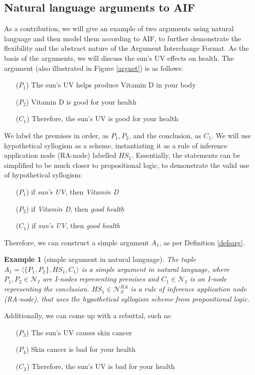\documentclass[12pt, a4paper]{article}
\newtheorem{Ex}{Example}[subsection]
\begin{document}
\subsection{Natural language arguments to AIF}
As a contribution, we will give an example of two arguments using natural language and then model them according to AIF, to further demonstrate the flexibility and the abstract nature of the Argument Interchange Format. As the basis of the arguments, we will discuss the sun's UV effects on health. The argument (also illustrated in Figure \ref{argnet}) is as follows:
\begin{itemize}
    \item[($P_1$)] The sun's UV helps produce Vitamin D in your body
    \item[($P_2$)] Vitamin D is good for your health
    \item[($C_1$)] Therefore, the sun's UV is good for your health
\end{itemize}
We label the premises in order, as $P_1, P_2$, and the conclusion, as $C_1$. We will use hypothetical syllogism as a scheme, instantiating it as a rule of inference application node (RA-node) labelled $HS_1$. Essentially, the statements can be simplified to be much closer to propositional logic, to demonstrate the valid use of hypothetical syllogism:
\begin{itemize}
    \item[($P_1$)] if \emph{sun's UV}, then \emph{Vitamin D}
    \item[($P_2$)] if \emph{Vitamin D}, then \emph{good health}
    \item[($C_1$)] if \emph{sun's UV}, then \emph{good health}
\end{itemize}
Therefore, we can construct a simple argument $A_1$, as per Definition \ref{defsarg}.
\begin{Ex}[simple argument in natural language]
\sloppy The tuple $A_1 = \langle \lbrace P_1, P_2 \rbrace, HS_1, C_1\rangle$ is a simple argument in natural language, where $P_1, P_2 \in \mathcal{N}_I$ are I-nodes representing premises and $C_1 \in \mathcal{N}_I$ is an I-node representing the conclusion. $HS_1 \in \mathcal{N}_S^{RA}$ is a rule of inference application node (RA-node), that uses the hypothetical syllogism scheme from propositional logic.
\end{Ex}
Additionally, we can come up with a rebuttal, such as:
\begin{itemize}
    \item[($P_3$)] The sun's UV causes skin cancer
    \item[($P_4$)] Skin cancer is bad for your health
    \item[($C_2$)] Therefore, the sun's UV is bad for your health
\end{itemize}
\end{document}
